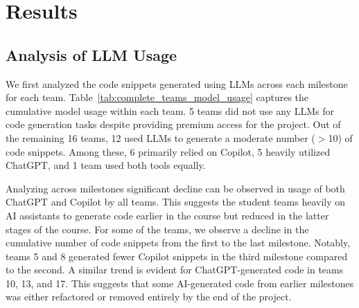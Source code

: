 




\section{Results}\label{secres}


\subsection{Analysis of LLM Usage}
We first analyzed the code snippets generated using LLMs across each milestone for each team. Table~\ref{tab:complete_teams_model_usage} captures the cumulative model usage within each team. 5 teams did not use any LLMs for code generation tasks despite providing premium access for the project. 
Out of the remaining 16 teams, 12 used LLMs to generate a moderate number ($>$10) of code snippets. Among these, 6 primarily relied on Copilot, 5 heavily utilized ChatGPT, and 1 team used both tools equally. 

Analyzing across milestones significant decline can be observed in usage of both ChatGPT and Copilot by all teams. This suggests the student teams heavily on AI assistants to generate code earlier in the course but reduced in the latter stages of the course. For some of the teams, we observe a decline in the cumulative number of code snippets from the first to the last milestone. Notably, teams 5 and 8 generated fewer Copilot snippets in the third milestone compared to the second. A similar trend is evident for ChatGPT-generated code in teams 10, 13, and 17. This suggests that some AI-generated code from earlier milestones was either refactored or removed entirely by the end of the project.

% 





